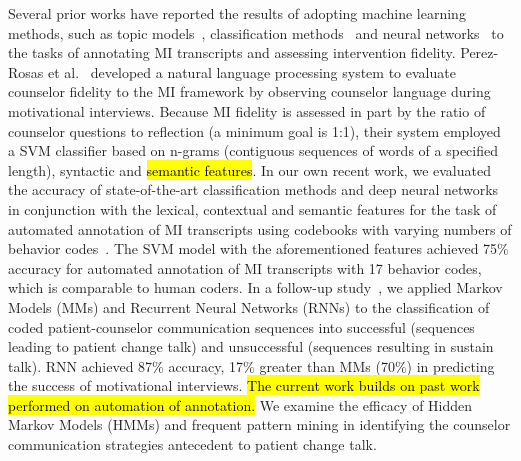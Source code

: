 \documentclass[smallextended]{svjour3}       %
\begin{document}
Several prior works have reported the results of adopting machine learning methods, such as topic models~\cite{kotov2014towards, gaut2017content, imel2015computational, kotov2015interpretable, atkins2014scaling}, classification methods~\cite{hasan2016study, can2016sounds, perez2017predicting, perez2017understanding} and neural networks~\cite{hasan2016study, tanana2015recursive, tanana2016comparison} to the tasks of annotating MI transcripts and assessing intervention fidelity. Perez-Rosas et al.~\cite{perez2017predicting} developed a natural language processing system to evaluate counselor fidelity to the MI framework by observing counselor language during motivational interviews. Because MI fidelity is assessed in part by the ratio of counselor questions to reflection (a minimum goal is 1:1), their system employed a SVM classifier based on n-grams (contiguous sequences of words of a specified length), syntactic and \hl{semantic features}. In our own recent work, we evaluated the accuracy of state-of-the-art classification methods and deep neural networks in conjunction with the lexical, contextual and semantic features for the task of automated annotation of MI transcripts using codebooks with varying numbers of behavior codes~\cite{hasan2016study}. The SVM model with the aforementioned features achieved 75\% accuracy for automated annotation of MI transcripts with 17 behavior codes, which is comparable to human coders. In a follow-up study~\cite{hasan2018predicting}, we applied Markov Models (MMs) and Recurrent Neural Networks (RNNs) to the classification of coded patient-counselor communication sequences into successful (sequences leading to patient change talk) and unsuccessful (sequences resulting in sustain talk). RNN achieved 87\% accuracy, 17\% greater than MMs (70\%) in predicting the success of motivational interviews. \hl{The current work builds on past work performed on automation of annotation.} We examine the efficacy of Hidden Markov Models (HMMs) and frequent pattern mining in identifying the counselor communication strategies antecedent to patient change talk.
\end{document}

